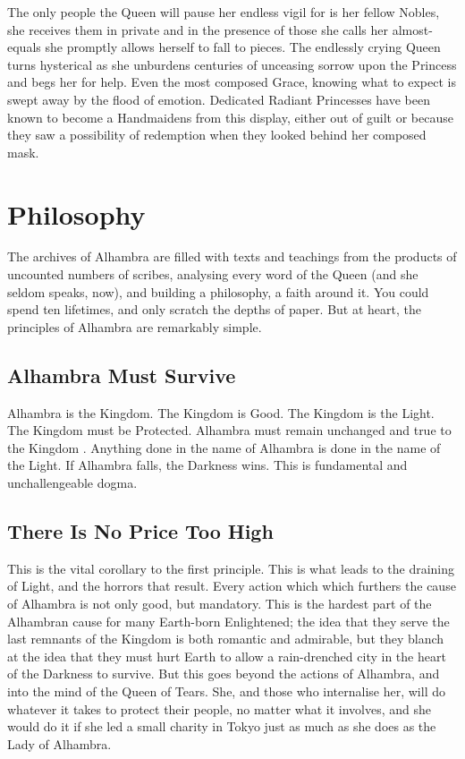 The only people the Queen will pause her endless vigil for is her fellow Nobles, she receives them in private and in the presence of those she calls her almost-equals she promptly allows herself to fall to pieces. The endlessly crying Queen turns hysterical as she unburdens centuries of unceasing sorrow upon the Princess and begs her for help. Even the most composed Grace, knowing what to expect is swept away by the flood of emotion. Dedicated Radiant Princesses have been known to become a Handmaidens from this display, either out of guilt or because they saw a possibility of redemption when they looked behind her composed mask. 

\section*{Philosophy}

The archives of Alhambra are filled with texts and teachings from the products of uncounted numbers of scribes, analysing every word of the Queen (and she seldom speaks, now), and building a philosophy, a faith around it. You could spend ten lifetimes, and only scratch the depths of paper. But at heart, the principles of Alhambra are remarkably simple. 

\subsection*{Alhambra Must Survive}

Alhambra is the Kingdom. The Kingdom is Good. The Kingdom is the Light. The Kingdom must be Protected. Alhambra must remain unchanged and true to the Kingdom . Anything done in the name of Alhambra is done in the name of the Light. If Alhambra falls, the Darkness wins. This is fundamental and unchallengeable dogma. 

\subsection*{There Is No Price Too High}

This is the vital corollary to the first principle. This is what leads to the draining of Light, and the horrors that result. Every action which which furthers the cause of Alhambra is not only good, but mandatory. This is the hardest part of the Alhambran cause for many Earth-born Enlightened; the idea that they serve the last remnants of the Kingdom is both romantic and admirable, but they blanch at the idea that they must hurt Earth to allow a rain-drenched city in the heart of the Darkness to survive. But this goes beyond the actions of Alhambra, and into the mind of the Queen of Tears. She, and those who internalise her, will do whatever it takes to protect their people, no matter what it involves, and she would do it if she led a small charity in Tokyo just as much as she does as the Lady of Alhambra. 

